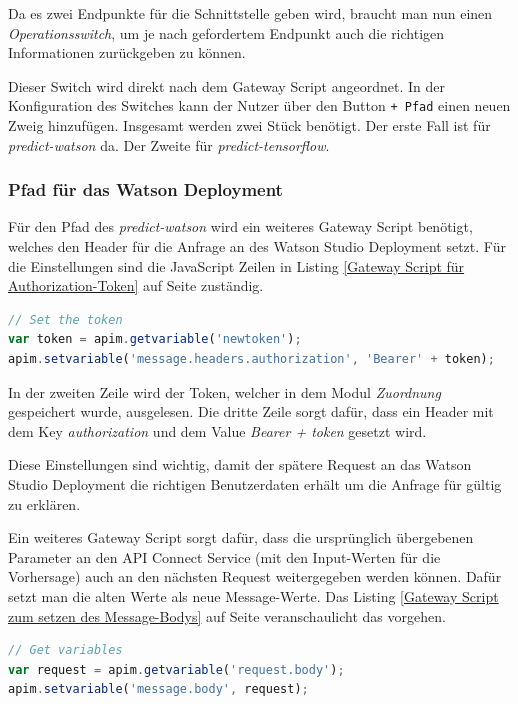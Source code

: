 Da es zwei Endpunkte für die Schnittstelle geben wird, braucht man nun einen \textit{Operationsswitch}, um je nach
gefordertem Endpunkt auch die richtigen Informationen zurückgeben zu können.

Dieser Switch wird direkt nach dem Gateway Script angeordnet. In der Konfiguration des Switches kann der Nutzer über den
Button \texttt{+ Pfad} einen neuen Zweig hinzufügen. Insgesamt werden zwei Stück benötigt. Der erste Fall ist für
\textit{predict-watson} da. Der Zweite für \textit{predict-tensorflow}.

\subsubsection*{Pfad für das Watson Deployment}
Für den Pfad des \textit{predict-watson} wird ein weiteres Gateway Script benötigt, welches den Header für die Anfrage
an des Watson Studio Deployment setzt. Für die Einstellungen sind die JavaScript Zeilen in Listing
\ref{Gateway Script für Authorization-Token} auf Seite \pageref{Gateway Script für Authorization-Token} zuständig.

\begin{lstlisting}[language=JavaScript, caption=Gateway Script für Authorization-Token, label=Gateway Script für Authorization-Token]
// Set the token
var token = apim.getvariable('newtoken');
apim.setvariable('message.headers.authorization', 'Bearer' + token);
\end{lstlisting}

In der zweiten Zeile wird der Token, welcher in dem Modul \textit{Zuordnung} gespeichert wurde, ausgelesen. Die dritte
Zeile sorgt dafür, dass ein Header mit dem Key \textit{authorization} und dem Value \textit{Bearer + token} gesetzt wird.

Diese Einstellungen sind wichtig, damit der spätere Request an das Watson Studio Deployment die richtigen Benutzerdaten
erhält um die Anfrage für gültig zu erklären.

Ein weiteres Gateway Script sorgt dafür, dass die ursprünglich übergebenen Parameter an den API Connect Service (mit den
Input-Werten für die Vorhersage) auch an den nächsten Request weitergegeben werden können. Dafür setzt man die alten Werte
als neue Message-Werte. Das Listing \ref{Gateway Script zum setzen des Message-Bodys} auf Seite
\pageref{Gateway Script zum setzen des Message-Bodys} veranschaulicht das vorgehen.

\begin{lstlisting}[language=JavaScript, caption=Gateway Script zum setzen des Message-Bodys, label=Gateway Script zum setzen des Message-Bodys]
// Get variables
var request = apim.getvariable('request.body');
apim.setvariable('message.body', request);
\end{lstlisting}

